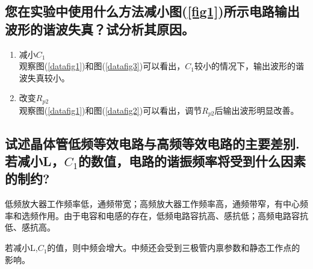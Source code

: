 \documentclass[a4paper]{article}
\begin{document}
\subsection{您在实验中使用什么方法减小图(\ref{fig1})所示电路输出波形的谐波失真？试分析其原因。}
\begin{enumerate}
\item 减小$C_1$\\
观察图(\ref{datafig1})和图(\ref{datafig3})可以看出，$C_1$较小的情况下，输出波形的谐波失真较小。
\item 改变$R_{p2}$\\
观察图(\ref{datafig1})和图(\ref{datafig2})可以看出，调节$R_{p2}$后输出波形明显改善。
\end{enumerate}
\subsection{试述晶体管低频等效电路与高频等效电路的主要差别.若减小L，$C_1$的数值，电路的谐振频率将受到什么因素的制约?}
低频放大器工作频率低，通频带宽；高频放大器工作频率高，通频带窄，有中心频率和选频作用。由于电容和电感的存在，低频电路容抗高、感抗低；高频电路容抗低、感抗高。

若减小L,$C_1$的值，则中频会增大。中频还会受到三极管内禀参数和静态工作点的影响。

\nocite{jiaocai}

\end{document}
